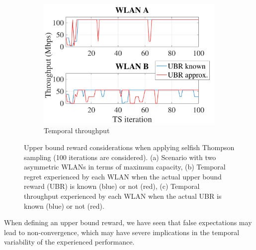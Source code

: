 \documentclass[preprint,12pt]{elsarticle}
\begin{document}
\begin{figure}[h!]
	\begin{subfigure}[b]{0.3\textwidth}
		\includegraphics[width=\textwidth]{approx_vs_actual_tpt}
		\caption{Temporal throughput}
		\label{fig:approx_vs_actual_tpt}
	\end{subfigure}
	\caption{Upper bound reward considerations when applying selfish Thompson sampling (100 iterations are considered). (a) Scenario with two asymmetric WLANs in terms of maximum capacity, (b) Temporal regret experienced by each WLAN when the actual upper bound reward (UBR) is known (blue) or not (red), (c) Temporal throughput experienced by each WLAN when the actual UBR is known (blue) or not (red).}	
	\label{fig:actual_vs_approximated_reward}
\end{figure} 

When defining an upper bound reward, we have seen that false expectations may lead to non-convergence, which may have severe implications in the temporal variability of the experienced performance.

\end{document}
